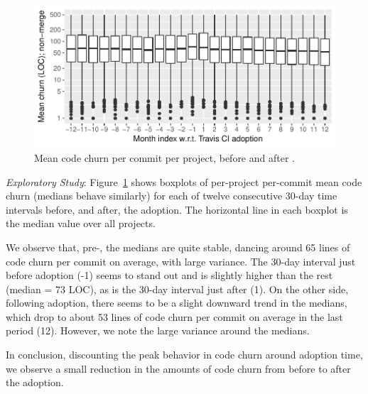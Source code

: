 \begin{figure}[t]
\centering
\includegraphics[width=\columnwidth, clip=true, trim=0 0 0 0]{figures/churn.pdf}
\caption{Mean code churn per commit per project, before and after \Tvi.}
\label{fig:churn}
\end{figure}

\smallskip\noindent \emph{Exploratory Study}: 
Figure~\ref{fig:churn} shows boxplots of per-project per-commit mean code 
churn (medians behave similarly) for each of twelve consecutive 30-day time 
intervals before, and after, the \Tvis adoption.
The horizontal line in each boxplot is the median value over all projects.

We observe that, pre-\Tvi, the medians are quite stable, dancing around 65 
lines of code churn per commit on average, with large variance.
The 30-day interval just before \Tvis adoption (-1) seems to stand out and is 
slightly higher than the rest (median = 73 LOC), as is the 30-day interval just after 
\Tvi (1).
On the other side, following \Tvis adoption, there seems to be a slight downward 
trend in the medians, which drop to about 53 lines of code churn per commit on 
average in the last period (12).
However, we note the large variance around the medians.

In conclusion, discounting the peak behavior in code churn around adoption 
time, we observe a small reduction in the amounts of code churn from before 
to after the adoption.


